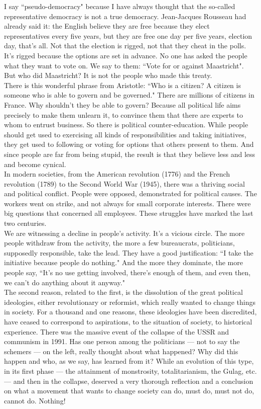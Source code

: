 I say ``pseudo-democracy" because I have always thought that the so-called representative democracy is not a true democracy. Jean-Jacques Rousseau had already said it: the English believe they are free because they elect representatives every five years, but they are free one day per five years, election day, that's all. Not that the election is rigged, not that they cheat in the polls. It's rigged because the options are set in advance. No one has asked the people what they want to vote on. We say to them: ``Vote for or against Maastricht". But who did Maastricht? It is not the people who made this treaty.\\
There is this wonderful phrase from Aristotle: ``Who is a citizen? A citizen is someone who is able to govern and be governed." There are millions of citizens in France. Why shouldn't they be able to govern? Because all political life aims precisely to make them unlearn it, to convince them that there are experts to whom to entrust business. So there is political counter-education. While people should get used to exercising all kinds of responsibilities and taking initiatives, they get used to following or voting for options that others present to them. And since people are far from  being stupid, the result is that they believe less and less and become cynical.\\
In modern societies, from the American revolution (1776) and the French revolution (1789) to the Second World War (1945), there was a thriving social and political conflict. People were opposed, demonstrated for political causes. The workers went on strike, and not always for small corporate interests. There were big questions that concerned all employees. These struggles have marked the last two centuries.\\
We are witnessing a decline in people's activity. It's a vicious circle. The more people withdraw from the activity, the more a few bureaucrats, politicians, supposedly responsible, take the lead. They have a good justification: ``I take the initiative because people do nothing." And the more they dominate, the more people say, ``It's no use getting involved, there's enough of them, and even then, we can't do anything about it anyway."\\
The second reason, related to the first, is the dissolution of the great political ideologies, either revolutionary or reformist, which really wanted to change things in society. For a thousand and one reasons, these ideologies have been discredited, have ceased to correspond to aspirations, to the situation of society, to historical experience. There was the massive event of the collapse of the USSR and communism in 1991. Has one person among the politicians --- not to say the schemers --- on the left, really thought about what happened? Why did this happen and who, as we say, has learned from it? While an evolution of this type, in its first phase --- the attainment of monstrosity, totalitarianism, the Gulag, etc. --- and then in the collapse, deserved a very thorough reflection and a conclusion on what a movement that wants to change society can do, must do, must not do, cannot do. Nothing!\\
